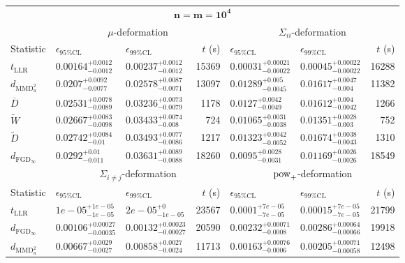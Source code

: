 \begin{tabular}{l|llr|llr}
	\toprule
	\multicolumn{7}{c}{$\mathbf{n=m=10^{4}}$} \\
	\multicolumn{1}{c}{} & \multicolumn{3}{c}{$\mu$-deformation} & \multicolumn{3}{c}{$\Sigma_{ii}$-deformation} \\
	Statistic & $\epsilon_{95\%\mathrm{CL}}$ & $\epsilon_{99\%\mathrm{CL}}$ & $t$ (s) & $\epsilon_{95\%\mathrm{CL}}$ & $\epsilon_{99\%\mathrm{CL}}$ & $t$ (s) \\
	\midrule
	$t_{\mathrm{LLR}}$ & $0.00164_{-0.0012}^{+0.0012}$ & $0.00237_{-0.0012}^{+0.0012}$ & 15369 & $0.00031_{-0.00022}^{+0.00021}$ & $0.00045_{-0.00022}^{+0.00022}$ & 16288 \\
	$d_{\mathrm{MMD}^{2}_{u}}$ & $0.0207_{-0.0077}^{+0.0092}$ & $0.02578_{-0.0071}^{+0.0087}$ & 13097 & $0.01289_{-0.0045}^{+0.005}$ & $0.01617_{-0.004}^{+0.0047}$ & 11382 \\
	$\overline{D}$ & $0.02531_{-0.0089}^{+0.0078}$ & $0.03236_{-0.0079}^{+0.0073}$ & 1178 & $0.0127_{-0.0049}^{+0.0042}$ & $0.01612_{-0.0042}^{+0.004}$ & 1266 \\
	$\widetilde{W}$ & $0.02667_{-0.0098}^{+0.0083}$ & $0.03433_{-0.008}^{+0.0074}$ & 724 & $0.01065_{-0.0038}^{+0.0031}$ & $0.01351_{-0.003}^{+0.0028}$ & 752 \\
	$\widetilde{D}$ & $0.02742_{-0.01}^{+0.0084}$ & $0.03493_{-0.0086}^{+0.0077}$ & 1217 & $0.01323_{-0.0052}^{+0.0042}$ & $0.01674_{-0.0043}^{+0.0038}$ & 1310 \\
	$d_{\mathrm{FGD}_{\infty}}$ & $0.0292_{-0.011}^{+0.01}$ & $0.03631_{-0.0088}^{+0.0089}$ & 18260 & $0.0095_{-0.0031}^{+0.0028}$ & $0.01169_{-0.0026}^{+0.0026}$ & 18549 \\
	\toprule
	\multicolumn{1}{c}{} & \multicolumn{3}{c}{$\Sigma_{i\neq j}$-deformation} & \multicolumn{3}{c}{$\rm{pow}_{+}$-deformation} \\
	Statistic & $\epsilon_{95\%\mathrm{CL}}$ & $\epsilon_{99\%\mathrm{CL}}$ & $t$ (s) & $\epsilon_{95\%\mathrm{CL}}$ & $\epsilon_{99\%\mathrm{CL}}$ & $t$ (s) \\
	\midrule
	$t_{\mathrm{LLR}}$ & $1e-05_{-1e-05}^{+1e-05}$ & $2e-05_{-1e-05}^{+0}$ & 23567 & $0.0001_{-7e-05}^{+7e-05}$ & $0.00015_{-7e-05}^{+7e-05}$ & 21799 \\
	$d_{\mathrm{FGD}_{\infty}}$ & $0.00106_{-0.00035}^{+0.00027}$ & $0.00132_{-0.00027}^{+0.00023}$ & 20590 & $0.00232_{-0.0008}^{+0.00071}$ & $0.00286_{-0.00066}^{+0.00064}$ & 19918 \\
	$d_{\mathrm{MMD}^{2}_{u}}$ & $0.00667_{-0.0027}^{+0.0029}$ & $0.00858_{-0.0024}^{+0.0027}$ & 11713 & $0.00163_{-0.0006}^{+0.00076}$ & $0.00205_{-0.00058}^{+0.00071}$ & 12498 \\

\end{tabular}
